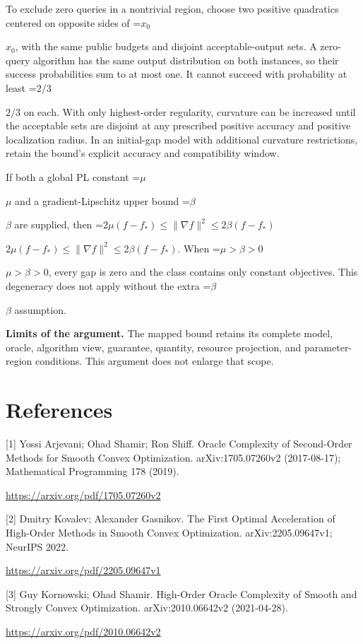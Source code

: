 \documentclass[10pt,a4paper]{article}
\newcommand{\AtlasMath}[1]{\par\begingroup\centering\setbox0=\hbox{$\displaystyle #1$}\ifdim\wd0>1.4\linewidth\typeout{ATLAS WIDE FORMULA: \the\wd0}\fi\ifdim\wd0>\linewidth\resizebox{\linewidth}{!}{\box0}\else\box0\fi\par\endgroup}
\newcommand{\AtlasInlineMath}[1]{\begingroup\setbox0=\hbox{$#1$}\ifdim\wd0>.4\linewidth\endgroup\AtlasMath{#1}\else\endgroup$#1$\fi}
\begin{document}
To exclude zero queries in a nontrivial region, choose two positive quadratics centered on opposite sides of \AtlasInlineMath{x_0}, with the same public budgets and disjoint acceptable-output sets. A zero-query algorithm has the same output distribution on both instances, so their success probabilities sum to at most one. It cannot succeed with probability at least \AtlasInlineMath{2/3} on each. With only highest-order regularity, curvature can be increased until the acceptable sets are disjoint at any prescribed positive accuracy and positive localization radius. In an initial-gap model with additional curvature restrictions, retain the bound's explicit accuracy and compatibility window.

If both a global PL constant \AtlasInlineMath{\mu} and a gradient-Lipschitz upper bound \AtlasInlineMath{\beta} are supplied, then \AtlasInlineMath{2\mu(f-f_*)\le\|\nabla f\|^2\le2\beta(f-f_*)}. When \AtlasInlineMath{\mu>\beta>0}, every gap is zero and the class contains only constant objectives. This degeneracy does not apply without the extra \AtlasInlineMath{\beta} assumption.

\textbf{Limits of the argument.} The mapped bound retains its complete model, oracle, algorithm view, guarantee, quantity, resource projection, and parameter-region conditions. This argument does not enlarge that scope.

\section{References}
[1] Yossi Arjevani; Ohad Shamir; Ron Shiff. Oracle Complexity of Second-Order Methods for Smooth Convex Optimization. arXiv:1705.07260v2 (2017-08-17); Mathematical Programming 178 (2019).

\url{https://arxiv.org/pdf/1705.07260v2}

[2] Dmitry Kovalev; Alexander Gasnikov. The First Optimal Acceleration of High-Order Methods in Smooth Convex Optimization. arXiv:2205.09647v1; NeurIPS 2022.

\url{https://arxiv.org/pdf/2205.09647v1}

[3] Guy Kornowski; Ohad Shamir. High-Order Oracle Complexity of Smooth and Strongly Convex Optimization. arXiv:2010.06642v2 (2021-04-28).

\url{https://arxiv.org/pdf/2010.06642v2}
\end{document}
